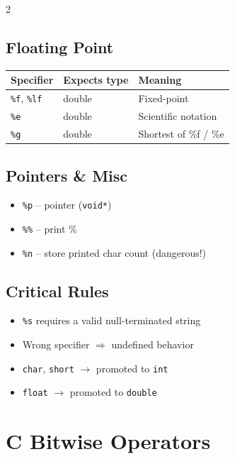 \documentclass[a4paper,9pt]{article}
\begin{document}
\begin{multicols}{2}
    \subsection*{Floating Point}
    \begin{tabular}{lll}
        \toprule
        Specifier & Expects type & Meaning \\
        \midrule
        \texttt{\%f}, \texttt{\%lf} & double & Fixed-point \\
        \texttt{\%e} & double & Scientific notation \\
        \texttt{\%g} & double & Shortest of \%f / \%e \\
        \bottomrule
    \end{tabular}
    
    \subsection*{Pointers \& Misc}
    \begin{itemize}
        \item \texttt{\%p} – pointer (\texttt{void*})
        \item \texttt{\%\%} – print \%
        \item \texttt{\%n} – store printed char count (dangerous!)
    \end{itemize}
    
    \subsection*{Critical Rules}
    \begin{itemize}
        \item \texttt{\%s} requires a valid null-terminated string
        \item Wrong specifier $\Rightarrow$ undefined behavior
        \item \texttt{char}, \texttt{short} $\rightarrow$ promoted to \texttt{int}
        \item \texttt{float} $\rightarrow$ promoted to \texttt{double}
    \end{itemize}
    \end{multicols}
    
    \section{C Bitwise Operators}
    
\end{document}
